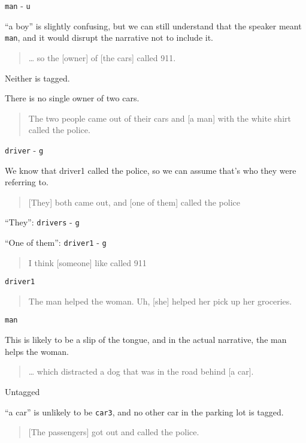 \documentclass[
]{book}
\begin{document}
\texttt{man} - \texttt{u}

``a boy'' is slightly confusing,
but we can still understand that the speaker meant \texttt{man},
and it would disrupt the narrative not to include it.

\begin{quote}
\ldots{} so the {[}owner{]} of {[}the cars{]} called 911.
\end{quote}

Neither is tagged.

There is no single owner of two cars.

\begin{quote}
The two people came out of their cars and {[}a man{]} with the white shirt called the police.
\end{quote}

\texttt{driver} - \texttt{g}

We know that driver1 called the police,
so we can assume that's who they were referring to.

\begin{quote}
{[}They{]} both came out, and {[}one of them{]} called the police
\end{quote}

``They'': \texttt{drivers} - \texttt{g}

``One of them'': \texttt{driver1} - \texttt{g}

\begin{quote}
I think {[}someone{]} like called 911
\end{quote}

\texttt{driver1}

\begin{quote}
The man helped the woman. Uh, {[}she{]} helped her pick up her groceries.
\end{quote}

\texttt{man}

This is likely to be a slip of the tongue,
and in the actual narrative, the man helps the woman.

\begin{quote}
\ldots{} which distracted a dog that was in the road behind {[}a car{]}.
\end{quote}

Untagged

``a car'' is unlikely to be \texttt{car3},
and no other car in the parking lot is tagged.

\begin{quote}
{[}The passengers{]} got out and called the police.
\end{quote}
\end{document}

